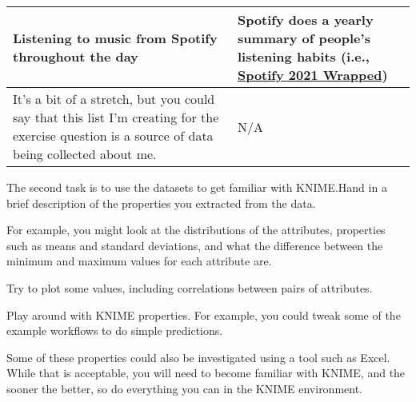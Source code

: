 \documentclass[
  coursecode={CMPE 251},
  assignmentname={Exercise 1},
  studentnumber=20053722,
  name={Bryan Hoang}
]{
  ltxanswer%
}
\begin{document}
\begin{questions}
\begin{solution}
\begin{center}
\begin{tabularx}{\textwidth}{
            >{\raggedright\arraybackslash}X
            >{\raggedright\arraybackslash}X}
          \midrule
          Listening to music from Spotify throughout the day                                                                                              & Spotify does a yearly summary of people's listening habits (i.e., \href{https://www.spotify.com/ca-en/wrapped/}{Spotify 2021 Wrapped})                                                                                                                                                                                                                                                \\
          \midrule
          It's a bit of a stretch, but you could say that this list I'm creating  for the exercise question is a source of data being collected about me. & N/A                                                                                                                                                                                                                                                                                                                                                                                   \\
          \bottomrule
        \end{tabularx}
      \end{center}
    \end{solution}

    \question[2]{}
    The second task is to use the datasets to get familiar with KNIME.\@ Hand in a brief description of the properties you extracted from the data.

    For example, you might look at the distributions of the attributes, properties such as means and standard deviations, and what the difference between the minimum and maximum values for each attribute are.

    Try to plot some values, including correlations between pairs of attributes.

    Play around with KNIME properties. For example, you could tweak some of the example workflows to do simple predictions.

    Some of these properties could also be investigated using a tool such as Excel. While that is acceptable, you will need to become familiar with KNIME, and the sooner the better, so do everything you can in the KNIME environment.


\end{questions}
\end{document}
